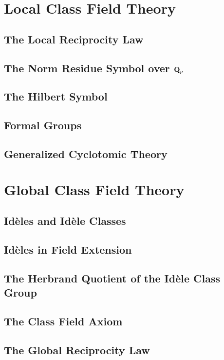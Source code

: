\documentclass[oneside]{amsbook}
\numberwithin{ex}{section}
\begin{document}
\chapter{Local Class Field Theory}
\section{The Local Reciprocity Law}

\section{The Norm Residue Symbol over $\mathbf{Q}_p$}

\section{The Hilbert Symbol}

\section{Formal Groups}

\section{Generalized Cyclotomic Theory}


\chapter{Global Class Field Theory}
\section{Idèles and Idèle Classes}

\section{Idèles in Field Extension}

\section{The Herbrand Quotient of the Idèle Class Group}

\section{The Class Field Axiom}

\section{The Global Reciprocity Law}

\end{document}
